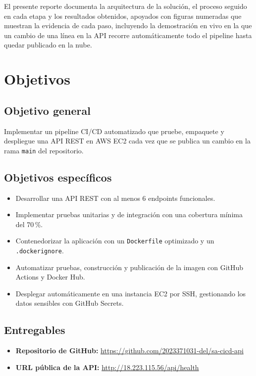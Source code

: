 \documentclass[12pt,letterpaper]{article}
\begin{document}
El presente reporte documenta la arquitectura de la solución, el proceso seguido en cada etapa y
los resultados obtenidos, apoyados con figuras numeradas que muestran la evidencia de cada paso,
incluyendo la demostración en vivo en la que un cambio de una línea en la API recorre
automáticamente todo el pipeline hasta quedar publicado en la nube.

\section{Objetivos}

\subsection{Objetivo general}
Implementar un pipeline CI/CD automatizado que pruebe, empaquete y despliegue una API REST en
AWS EC2 cada vez que se publica un cambio en la rama \texttt{main} del repositorio.

\subsection{Objetivos específicos}
\begin{itemize}
  \item Desarrollar una API REST con al menos 6 endpoints funcionales.
  \item Implementar pruebas unitarias y de integración con una cobertura mínima del 70\,\%.
  \item Contenedorizar la aplicación con un \texttt{Dockerfile} optimizado y un \texttt{.dockerignore}.
  \item Automatizar pruebas, construcción y publicación de la imagen con GitHub Actions y Docker Hub.
  \item Desplegar automáticamente en una instancia EC2 por SSH, gestionando los datos sensibles con GitHub Secrets.
\end{itemize}

\subsection{Entregables}
\begin{itemize}
  \item \textbf{Repositorio de GitHub:} \url{https://github.com/2023371031-del/sa-cicd-api}
  \item \textbf{URL pública de la API:} \url{http://18.223.115.56/api/health}
\end{itemize}
\end{document}
